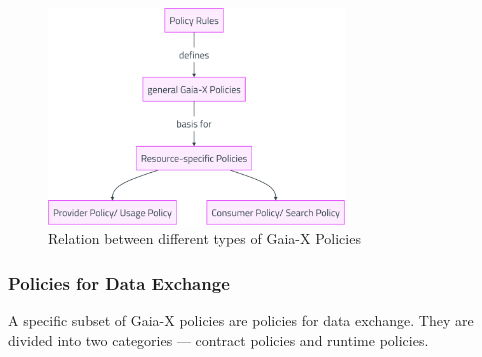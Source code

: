 \begin{figure}
    \centering
    \includegraphics[width=0.7\textwidth]{figures/policies.png}
    \caption{Relation between different types of Gaia-X Policies~\cite{gaiax_architecture_document}}\label{fig:gaiax_policies}
\end{figure}

\subsubsection{Policies for Data Exchange}

A specific subset of Gaia-X policies are policies for data exchange\cite{gaiax_data_exchange_document}.
They are divided into two categories --- contract policies and runtime policies.

